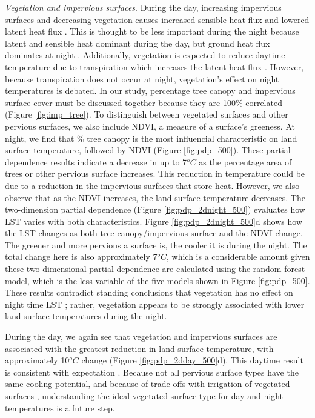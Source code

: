 \documentclass[final,3p,times,twocolumn,sort&compress]{elsarticle}
\begin{document}
\textit{Vegetation and impervious surfaces}. 
During the day, increasing impervious surfaces and decreasing vegetation causes increased sensible heat flux and lowered latent heat flux \cite{Voogt2003-mm, Peng2012-iy, Zhou2014-wc}.
This is thought to be less important during the night because latent and sensible heat dominant during the day, but ground heat flux dominates at night \cite{Zhou2014-wc, Voogt2003-mm}.
Additionally, vegetation is expected to reduce daytime temperature due to transpiration which increases the latent heat flux \cite{Zhou2014-wc}. 
However, because transpiration does not occur at night, vegetation's effect on night temperatures is debated. 
In our study, percentage tree canopy and impervious surface cover must be discussed together because they are 100\% correlated (Figure \ref{fig:imp_tree}).
To distinguish between vegetated surfaces and other pervious surfaces, we also include NDVI, a measure of a surface's greeness.
At night, we find that \% tree canopy is the most influencial characteristic on land surface temperature, followed by NDVI (Figure \ref{fig:pdp_500}).
These partial dependence results indicate a decrease in up to 7$^oC$ as the percentage area of trees or other pervious surface increases.
This reduction in temperature could be due to a reduction in the impervious surfaces that store heat.
However, we also observe that as the NDVI increases, the land surface temperature decreases.
The two-dimension partial dependence (Figure \ref{fig:pdp_2dnight_500}) evaluates how LST varies with both characteristics.
Figure \ref{fig:pdp_2dnight_500}d shows how the LST changes as both tree canopy/impervious surface and the NDVI change.
The greener and more pervious a surface is, the cooler it is during the night. 
The total change here is also approximately 7$^oC$, which is a considerable amount given these two-dimensional partial dependence are calculated using the random forest model, which is the less variable of the five models shown in Figure \ref{fig:pdp_500}.
These results contradict standing conclusions that vegetation has no effect on night time LST \cite{Peng2012-iy, Zhou2014-wc};
rather, vegetation appears to be strongly associated with lower land surface temperatures during the night.

During the day, we again see that vegetation and impervious surfaces are associated with the greatest reduction in land surface temperature, with approximately 10$^oC$ change (Figure \ref{fig:pdp_2dday_500}d). 
This daytime result is consistent with expectation \cite{Chun2017-mm, Peng2018-cp, Wang2019-tree,Zhou2014-wc, Chun2018-so}.
Because not all pervious surface types have the same cooling potential, and because of trade-offs with irrigation of vegetated surfaces \cite{Gober2009-im}, understanding the ideal vegetated surface type for day and night temperatures is a future step.
\end{document}
